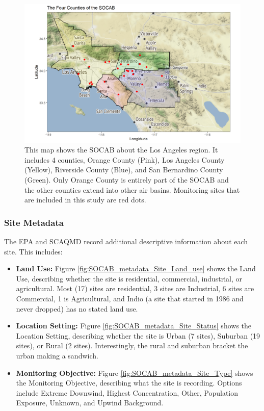 \begin{figure}[ht]
\centering
\includegraphics[width = \textwidth]{Figures/SOCAB_counties.png}
\caption{This map shows the \ac{SOCAB} about the Los Angeles region.  It includes 4 counties, Orange County (Pink), Los Angeles County (Yellow), Riverside County (Blue), and San Bernardino County (Green).  Only Orange County is entirely part of the \ac{SOCAB} and the other counties extend into other air basins.  Monitoring sites that are included in this study are red dots.}
\label{fig:SOCAB_counties}
\end{figure}

\subsubsection*{Site Metadata}
\label{subsubsec:sitemetadata}
The \ac{EPA} and \ac{SCAQMD} record additional descriptive information about each site.  This includes:  

\begin{itemize}
\item \textbf{Land Use:} Figure  \ref{fig:SOCAB_metadata_Site_Land_use} shows the Land Use, describing whether the site is residential, commercial, industrial, or agricultural.  Most (17) sites are residential, 3 sites are Industrial, 6 sites are Commercial, 1 is Agricultural, and Indio (a site that started in 1986 and never dropped) has no stated land use.

\item \textbf{Location Setting:} Figure  \ref{fig:SOCAB_metadata_Site_Status} shows the Location Setting, describing whether the site is Urban (7 sites), Suburban (19 sites), or Rural (2 sites).  Interestingly, the rural and suburban bracket the urban making a sandwich.  

\item \textbf{Monitoring Objective:} Figure  \ref{fig:SOCAB_metadata_Site_Type} shows the Monitoring Objective, describing what the site is recording.  Options include Extreme Downwind, Highest Concentration, Other, Population Exposure, Unknown, and Upwind Background.   
\end{itemize}


